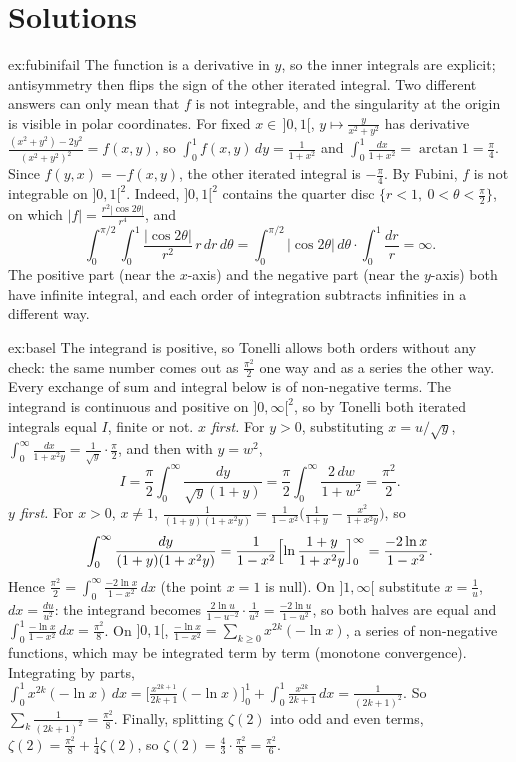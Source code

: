 \section{Solutions}

\begin{solution}{ex:fubinifail}
\idea The function is a derivative in $y$, so the inner integrals are explicit; antisymmetry then flips the sign of the other iterated integral. Two different answers can only mean that $f$ is
not integrable, and the singularity at the origin is visible in polar coordinates.
\writeup For fixed $x\in\,]0,1[$, $y\mapsto\frac y{x^2+y^2}$ has derivative $\frac{(x^2+y^2)-2y^2}{(x^2+y^2)^2}=f(x,y)$, so $\int_0^1f(x,y)\,dy=\frac1{1+x^2}$ and $\int_0^1\frac{dx}{1+x^2}=\arctan1=\frac\pi4$. Since
$f(y,x)=-f(x,y)$, the other iterated integral is $-\frac\pi4$. By Fubini, $f$ is not integrable on $]0,1[^2$. Indeed, $]0,1[^2$ contains the quarter disc $\{r<1,\ 0<\theta<\frac\pi2\}$, on which
$|f|=\frac{r^2|\cos2\theta|}{r^4}$, and
\[\int_0^{\pi/2}\!\!\int_0^1\frac{|\cos2\theta|}{r^2}\,r\,dr\,d\theta=\int_0^{\pi/2}|\cos2\theta|\,d\theta\cdot\int_0^1\frac{dr}r=\infty.\]
The positive part (near the $x$-axis) and the negative part (near the $y$-axis) both have infinite integral, and each order of integration subtracts infinities in a different way.
\end{solution}

\begin{solution}{ex:basel}
\idea The integrand is positive, so Tonelli allows both orders without any check: the same number comes out as $\frac{\pi^2}2$ one way and as a series the other way. Every exchange of
sum and integral below is of non-negative terms.
\writeup The integrand is continuous and positive on $]0,\infty[^2$, so by Tonelli both iterated integrals equal $I$, finite or not. \emph{$x$ first.} For $y>0$, substituting $x=u/\sqrt y$,
$\int_0^\infty\frac{dx}{1+x^2y}=\frac1{\sqrt y}\cdot\frac\pi2$, and then with $y=w^2$,
\[I=\frac\pi2\int_0^\infty\frac{dy}{\sqrt y(1+y)}=\frac\pi2\int_0^\infty\frac{2\,dw}{1+w^2}=\frac{\pi^2}2.\]
\emph{$y$ first.} For $x>0$, $x\ne1$, $\frac1{(1+y)(1+x^2y)}=\frac1{1-x^2}\bigl(\frac1{1+y}-\frac{x^2}{1+x^2y}\bigr)$, so
\[\int_0^\infty\frac{dy}{(1+y)(1+x^2y)}=\frac1{1-x^2}\Bigl[\ln\frac{1+y}{1+x^2y}\Bigr]_0^\infty=\frac{-2\ln x}{1-x^2}.\]
Hence $\frac{\pi^2}2=\int_0^\infty\frac{-2\ln x}{1-x^2}\,dx$ (the point $x=1$ is null). On $]1,\infty[$ substitute $x=\frac1u$, $dx=\frac{du}{u^2}$: the integrand becomes $\frac{2\ln u}{1-u^{-2}}\cdot\frac1{u^2}=\frac{-2\ln u}{1-u^2}$, so both
halves are equal and $\int_0^1\frac{-\ln x}{1-x^2}\,dx=\frac{\pi^2}8$. On $]0,1[$, $\frac{-\ln x}{1-x^2}=\sum_{k\ge0}x^{2k}(-\ln x)$, a series of non-negative functions, which may be integrated term by term (monotone
convergence). Integrating by parts, $\int_0^1x^{2k}(-\ln x)\,dx=\bigl[\frac{x^{2k+1}}{2k+1}(-\ln x)\bigr]_0^1+\int_0^1\frac{x^{2k}}{2k+1}\,dx=\frac1{(2k+1)^2}$. So $\sum_k\frac1{(2k+1)^2}=\frac{\pi^2}8$. Finally, splitting
$\zeta(2)$ into odd and even terms, $\zeta(2)=\frac{\pi^2}8+\frac14\zeta(2)$, so $\zeta(2)=\frac43\cdot\frac{\pi^2}8=\frac{\pi^2}6$.
\end{solution}

